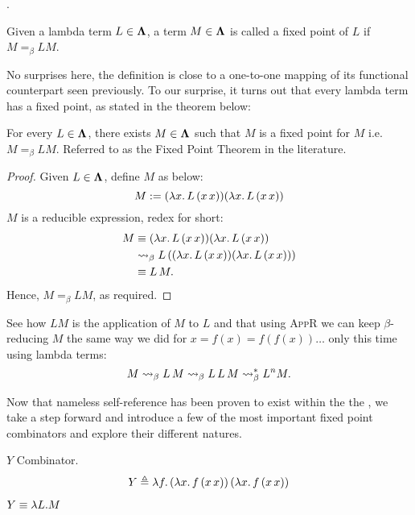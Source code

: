 \documentclass[12pt]{book}
\begin{document}
.
\begin{definition}
  Given a lambda term \( L \in \mathbf{\Lambda} \), a term \( M \in \mathbf{\Lambda} \) is called a fixed point of \( L \) if \( M =_\beta L M \).
\end{definition}
No surprises here, the definition is close to a one-to-one mapping of its functional counterpart seen previously. To our surprise, it turns out that every lambda term has a fixed point, as stated in the theorem below:
\begin{theorem}
  For every \( L \in \mathbf{\Lambda} \), there exists \( M \in \mathbf{\Lambda} \) such that $ M $ is a fixed point for $ M $ i.e. $ M =_\beta L M $. Referred to as the Fixed Point Theorem in the literature.
\end{theorem}
\begin{proof} Given $L \in \mathbf{\Lambda}$, define $M$ as below:
  \[
    M := (\lambda x . \, L \, (x \, x))(\lambda x . \, L \, (x \, x))
  \]
  $M$ is a reducible expression, redex for short:
  \begin{align*}
    M 
    &\equiv (\lambda x . \, L \, (x \, x))(\lambda x . \, L \, (x \, x)) \\
    &\mathrel{\leadsto}_\beta L \, ((\lambda x . \, L \, (x \, x))(\lambda x . \, L\, (x \, x))) \\
    &\equiv L \, M.
  \end{align*}
  Hence, $ M =_\beta L M $, as required.
\end{proof}
\begin{remark}
  See how $ L M $ is the application of $ M $ to $ L $ and that using \textsc{AppR} we can keep $\beta$-reducing $ M $ the same way we did for $ x = f(x) = f(f(x))\dots $ only this time using lambda terms:
  \[
    M \mathrel{\leadsto}_\beta L \, M \mathrel{\leadsto}_\beta L \, L \, M \mathrel{\leadsto}_\beta^* L^n M.
  \]
\end{remark}
Now that nameless self-reference has been proven to exist within the the \lcalc, we take a step forward and introduce a few of the most important fixed point combinators and explore their different natures.
\begin{definition} $Y$ Combinator. 
\[
  Y \triangleq \lambda f.\, (\lambda x.\, f\, (x\, x))\, (\lambda x.\, f\, (x\, x))
\]
\end{definition}
\begin{note}
  \( Y \equiv \lambda L . M  \) 
\end{note}
\end{document}
